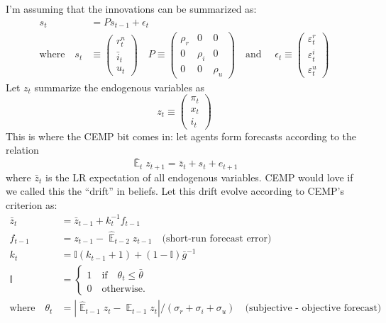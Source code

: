 \documentclass[11pt]{article}
\renewcommand{\[}{\begin{equation}}
\renewcommand{\]}{\end{equation}}
\DeclareMathOperator{\E}{\mathbb{E}}
\begin{document}
 I'm assuming that the innovations can be summarized as:
 \begin{align}
 s_t & = P s_{t-1} + \epsilon_t \\
 \text{where} \quad 
 s_t & \equiv \begin{pmatrix} r_t^n \\ \bar{i}_t \\ u_t 
 \end{pmatrix} \quad 
 P  \equiv \begin{pmatrix} \rho_r & 0 & 0 \\ 0& \rho_i & 0 \\ 0&0& \rho_u 
 \end{pmatrix}  \quad 
 \text{and } \quad 
 \epsilon_t \equiv \begin{pmatrix}\varepsilon_t^{r} \\ \varepsilon_t^{i}  \\ \varepsilon_t^{u} 
 \end{pmatrix} 
 \end{align}
 Let $z_t$ summarize the endogenous variables as
 \begin{equation}
 z_t \equiv \begin{pmatrix} \pi_t \\ x_t \\ i_t
 \end{pmatrix}
 \end{equation}
This is where the CEMP bit comes in: let agents form forecasts according to the relation
\begin{equation}
\bar{\E}_t z_{t+1} = \bar{z}_t + s_{t} + e_{t+1} \tag{PLM}
\end{equation}
where $\bar{z}_t$ is the LR expectation of all endogenous variables. CEMP would love if we called this the ``drift'' in beliefs. Let this drift evolve according to CEMP's criterion as:
\begin{align}
\bar{z}_t & = \bar{z}_{t-1} + k_t^{-1} f_{t-1} \\
f_{t-1} & = z_{t-1} - \hat{\E}_{t-2}z_{t-1} \quad \text{(short-run forecast error)} \\
k_t & = \mathbb{I}(k_{t-1}+1) + (1-\mathbb{I})\bar{g}^{-1} \\
\mathbb{I} &= \begin{cases} 1 \quad \text{if} \quad \theta_t \leq \bar{\theta} \\
0 \quad \text{otherwise.}
\end{cases} \\
\text{where} \quad \theta_t & = |\hat{\E}_{t-1}z_t - \E_{t-1}z_t  | / (\sigma_r + \sigma_i + \sigma_u) \quad \text{(subjective - objective forecast)}
\end{align}
\end{document}
